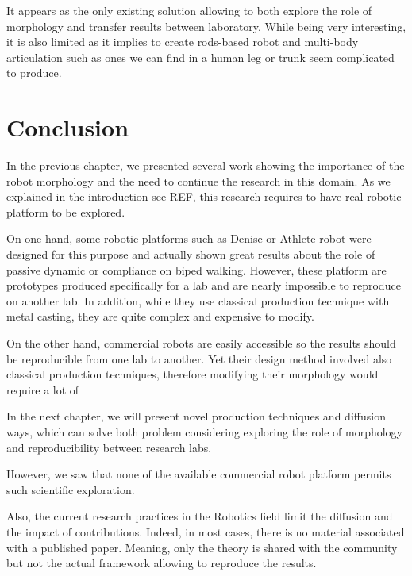 It appears as the only existing solution allowing to both explore the role of morphology and transfer results between laboratory. While being very interesting, it is also limited as it implies to create rods-based robot and multi-body articulation such as ones we can find in a human leg or trunk seem complicated to produce.


\section{Conclusion}

In the previous chapter, we presented several work showing the importance of the robot morphology and the need to continue the research in this domain. As we explained in the introduction see REF, this research requires to have real robotic platform to be explored.


On one hand, some robotic platforms such as Denise or Athlete robot were designed for this purpose and actually shown great results about the role of passive dynamic or compliance on biped walking. However, these platform are prototypes produced specifically for a lab and are nearly impossible to reproduce on another lab.
In addition, while they use classical production technique with metal casting, they are quite complex and expensive to modify.

On the other hand, commercial robots are easily accessible so the results should be reproducible from one lab to another. Yet their design method involved also classical production techniques, therefore modifying their morphology would require a lot of



In the next chapter, we will present novel production techniques and diffusion ways, which can solve both problem considering exploring the role of morphology and reproducibility between research labs.


However, we saw that none of the available commercial robot platform permits such scientific exploration.

Also, the current research practices in the Robotics field limit the diffusion and the impact of contributions.
Indeed, in most cases, there is no material associated with a published paper.
Meaning, only the theory is shared with the community but not the actual framework allowing to reproduce the results.

